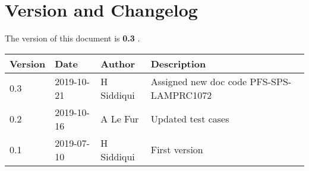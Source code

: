 \section{Version and Changelog}

The version of this document is {\bf 0.3} .

\begin{table}[H]
    \begin{tabular}{|l|l|l|p{10cm}| }
    \hline
    {\bf Version} & {\bf Date} & {\bf Author} & {\bf Description} \\ \hline
    0.3 & 2019-10-21 & H Siddiqui & Assigned new doc code PFS-SPS-LAMPRC1072 \\ \hline
    0.2 & 2019-10-16 & A Le Fur & Updated test cases \\ \hline
    0.1 & 2019-07-10 & H Siddiqui & First version \\ \hline
    \end{tabular}
\end{table}

